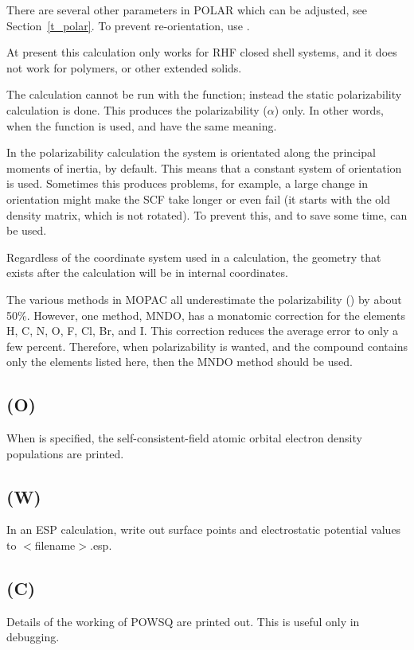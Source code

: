 There are several other parameters in POLAR which can be adjusted,
see Section~\ref{t_polar}. To prevent re-orientation, use .

At present this calculation only works for RHF closed shell systems, and it
does not work for polymers, or other extended solids.

The  calculation cannot be run with the  function;
instead the static polarizability calculation is done.  This produces the
polarizability ($\alpha$) only.  In other words, when the 
function is used,
 and  have the same meaning.

In the polarizability calculation the system is orientated along the principal
moments of inertia, by default.  This means that a constant system of
orientation is used.  Sometimes this produces problems, for example,
a large change in orientation might make the SCF take longer or even fail
(it starts with the old density matrix, which is not rotated).
To prevent this, and to save some time,  can be used.

Regardless of the coordinate system used in a  calculation, the
geometry that exists after the calculation will be in internal coordinates.

The various methods in MOPAC all underestimate the polarizability () by
about 50\%.  However, one method, MNDO, has a monatomic correction for the elements
H, C, N, O, F, Cl, Br, and I.  This correction reduces the average error to
only a few percent.  Therefore, when polarizability is wanted, and the compound
contains only the elements listed here, then the MNDO method should be used.

\subsection*{ (O)}
When  is specified, the self-consistent-field atomic
orbital electron density populations are printed.


\subsection*{ (W)}
   In an  ESP  calculation,  write  out  surface  points  and  electrostatic
   potential values to $<\! $filename$\! >$.esp.

\subsection*{ (C)}
        Details of the working of POWSQ  are  printed  out.   This  is  useful only
 in debugging.


